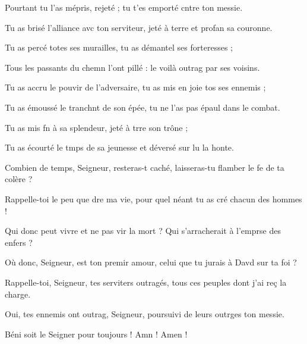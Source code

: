 \item Pourtant tu l’as mépris, rejeté ;\psstar{} tu t’es emporté cntre ton messie.
\item Tu as brisé l’alliance avc ton serviteur,\psstar{} jeté à terre et profan sa couronne.
\item Tu as percé totes ses murailles,\psstar{} tu as démantel ses forteresses ;
\item Tous les passants du chemn l’ont pillé :\psstar{} le voilà outrag par ses voisins.
\item Tu as accru le pouvir de l’adversaire,\psstar{} tu as mis en joie tos ses ennemis ;
\item Tu as émoussé le tranchnt de son épée,\psstar{} tu ne l’as pas épaul dans le combat.
\item Tu as mis fn à sa splendeur,\psstar{} jeté à trre son trône ;
\item Tu as écourté le tmps de sa jeunesse\psstar{} et déversé sur lu la honte.
\item Combien de temps, Seigneur, resteras-t caché,\psstar{} laisseras-tu flamber le fe de ta colère ?
\item Rappelle-toi le peu que dre ma vie,\psstar{} pour quel néant tu as cré chacun des hommes !
\item Qui donc peut vivre et ne pas vir la mort ?\psstar{} Qui s’arracherait à l’emprse des enfers ?
\item Où donc, Seigneur, est ton premir amour,\psstar{} celui que tu jurais à Davd sur ta foi ?
\item Rappelle-toi, Seigneur, tes serviters outragés,\psstar{} tous ces peuples dont j’ai reç la charge.
\item Oui, tes ennemis ont outrag, Seigneur,\psstar{} poursuivi de leurs outrges ton messie.
\item Béni soit le Seigner pour toujours !\psstar{} Amn ! Amen !